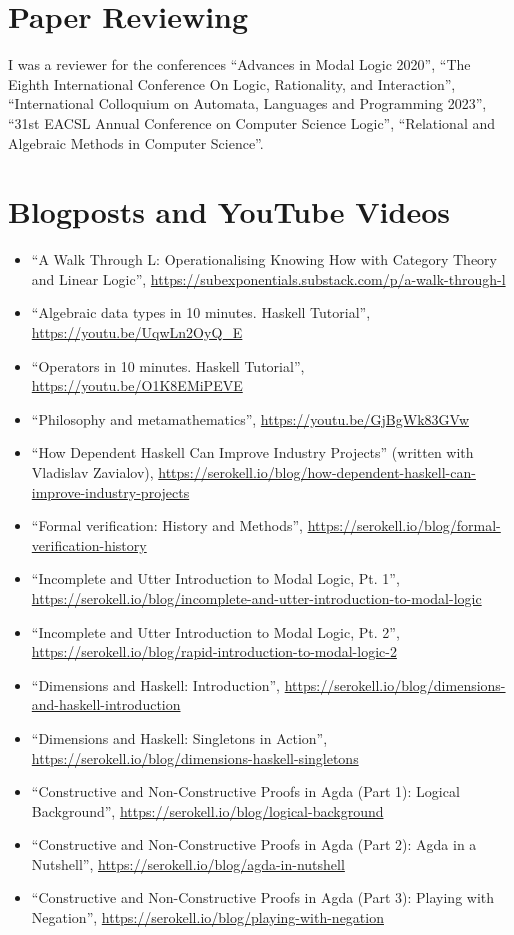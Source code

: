 \documentclass[11pt,a4paper]{article}
\begin{document}
\section{Paper Reviewing}

I was a reviewer for the conferences ``Advances in Modal Logic 2020'', ``The Eighth International Conference On Logic, Rationality, and Interaction'', ``International Colloquium on Automata, Languages and Programming 2023'', ``31st EACSL Annual Conference on Computer Science Logic'',
``Relational and Algebraic Methods in Computer Science''.

\section{Blogposts and YouTube Videos}

\begin{itemize}[leftmargin=*]
    \item ``A Walk Through L: Operationalising Knowing How with Category Theory and Linear Logic'', \url{https://subexponentials.substack.com/p/a-walk-through-l}
    \item ``Algebraic data types in 10 minutes. Haskell Tutorial'', \url{https://youtu.be/UqwLn2OyQ_E}
    \item ``Operators in 10 minutes. Haskell Tutorial'', \url{https://youtu.be/O1K8EMiPEVE}
    \item ``Philosophy and metamathematics'', \url{https://youtu.be/GjBgWk83GVw}
    \item ``How Dependent Haskell Can Improve Industry Projects'' (written with Vladislav Zavialov), \url{https://serokell.io/blog/how-dependent-haskell-can-improve-industry-projects}
    \item ``Formal verification: History and Methods'', \url{https://serokell.io/blog/formal-verification-history}
    \item ``Incomplete and Utter Introduction to Modal Logic, Pt. 1'', \url{https://serokell.io/blog/incomplete-and-utter-introduction-to-modal-logic}
    \item ``Incomplete and Utter Introduction to Modal Logic, Pt. 2'', \url{https://serokell.io/blog/rapid-introduction-to-modal-logic-2}
    \item ``Dimensions and Haskell: Introduction'', \url{https://serokell.io/blog/dimensions-and-haskell-introduction}
    \item ``Dimensions and Haskell: Singletons in Action'', \url{https://serokell.io/blog/dimensions-haskell-singletons}
    \item ``Constructive and Non-Constructive Proofs in Agda (Part 1): Logical Background'', \url{https://serokell.io/blog/logical-background}
    \item ``Constructive and Non-Constructive Proofs in Agda (Part 2): Agda in a Nutshell'', \url{https://serokell.io/blog/agda-in-nutshell}
    \item ``Constructive and Non-Constructive Proofs in Agda (Part 3): Playing with Negation'', \url{https://serokell.io/blog/playing-with-negation}
\end{itemize}
\end{document}
